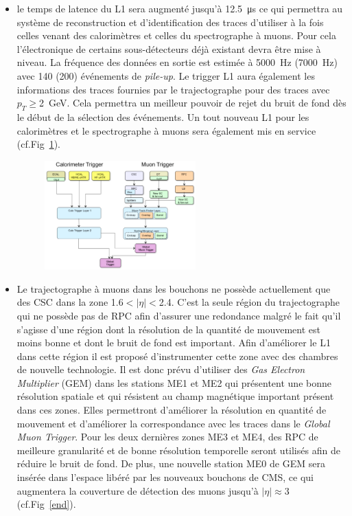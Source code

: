 \begin{itemize}[label=$\bullet$]
	\item le temps de latence du L1 sera augmenté jusqu'à \SI{12.5}{\micro\second} ce qui permettra au système de reconstruction et d'identification des traces d'utiliser à la fois celles venant des calorimètres et celles du spectrographe à muons. Pour cela l'électronique de certains sous-détecteurs déjà existant devra être mise à niveau. La fréquence des données en sortie est estimée à \SI{5000}{\hertz} (\SI{7000}{\hertz}) avec \num{140} (\num{200}) événements de \textit{pile-up}. Le trigger L1 aura également les informations des traces fournies par le trajectographe pour des traces avec $p_{T}\geq$\SI{2}{\giga\eV}. Cela permettra un meilleur pouvoir de rejet du bruit de fond dès le début de la sélection des événements. Un tout nouveau L1 pour les calorimètres et le spectrographe à muons sera également mis en service (cf.Fig~\ref{L1_2}).
	\begin{figure}[ht!]
		\centering
		\includegraphics[width=0.55\textwidth]{CMS/L1_2.png}
		\label{L1_2}
	\end{figure}
\item Le trajectographe à muons dans les bouchons ne possède actuellement que des CSC dans la zone \num{1.6}$<|\eta|<$\num{2.4}. C'est la seule région du trajectographe qui ne possède pas de RPC afin d'assurer une redondance malgré le fait qu'il s'agisse d'une région dont la résolution de la quantité de mouvement est moins bonne et dont le bruit de fond est important. Afin d'améliorer le L1 dans cette région il est proposé d'instrumenter cette zone avec des chambres de nouvelle technologie. Il est donc prévu d'utiliser des \textit{Gas Electron Multiplier} (GEM) dans les stations ME1 et ME2 qui présentent une bonne résolution spatiale et qui résistent au champ magnétique important présent dans ces zones. Elles permettront d'améliorer la résolution en quantité de mouvement et d'améliorer la correspondance avec les traces dans le \textit{Global Muon Trigger}. Pour les deux dernières zones ME3 et ME4, des RPC de meilleure granularité et de bonne résolution temporelle seront utilisés afin de réduire le bruit de fond.  De plus, une nouvelle station ME0 de GEM sera insérée dans l'espace libéré par les nouveaux bouchons de CMS, ce qui augmentera la couverture de détection des muons jusqu'à $|\eta|\approx$\num{3} (cf.Fig~\ref{end}). 

\end{itemize}
